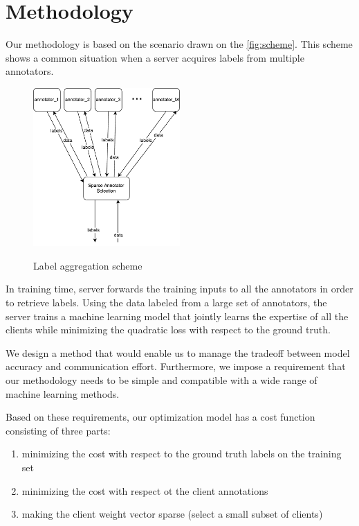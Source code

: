 \documentclass{llncs}
\begin{document}
\section{Methodology}

Our methodology is based on the scenario drawn on the \autoref{fig:scheme}. This scheme shows a common situation when a server acquires labels from multiple annotators. 

\begin{figure}
  \caption{Label aggregation scheme}
  \centering
    \includegraphics[width=0.5\textwidth]{figures/lowbudget.pdf}
  \label{fig:scheme}
\end{figure}

In training time, server forwards the training inputs to all the annotators in order to retrieve labels. Using the data labeled from a large set of annotators, the server trains a machine learning model that jointly learns the expertise of all the clients while minimizing the quadratic loss with respect to the ground truth.  

We design a method that would enable us to manage the tradeoff between model accuracy and communication effort. Furthermore, we impose a requirement that our methodology needs to be simple and compatible with a wide range of machine learning methods. 

Based on these requirements, our optimization model has a cost function consisting of three parts:

\begin{enumerate}
\item minimizing the cost with respect to the ground truth labels on the training set
\item minimizing the cost with respect ot the client annotations
\item making the client weight vector sparse (select a small subset of clients)
\end{enumerate}
\end{document}
